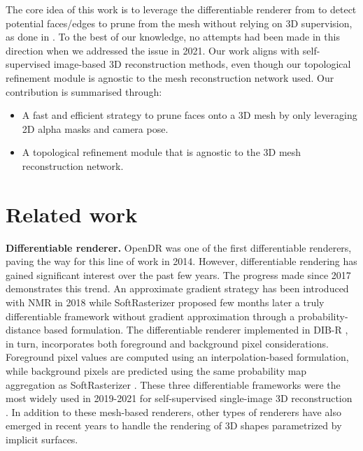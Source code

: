 The core idea of this work is to leverage the differentiable renderer from \citep{ravi2020accelarating} to detect potential faces/edges to prune from the mesh without relying on 3D supervision, as done in \citep{pan2019deep,nie2020total3dunderstanding,smith2019geometrics}. To the best of our knowledge, no attempts had been made in this direction when we addressed the issue in 2021. Our work aligns with self-supervised image-based 3D reconstruction methods, even though our topological refinement module is agnostic to the mesh reconstruction network used. Our contribution is summarised through: 
\begin{itemize}
    
    \item A fast and efficient strategy to prune faces onto a 3D mesh by only leveraging 2D alpha masks and camera pose. 

    \item A topological refinement module that is agnostic to the 3D mesh reconstruction network.
\end{itemize}

\section{Related work}
\label{sec:related_works}

\noindent\textbf{Differentiable renderer.} OpenDR \citep{loper2014opendr} was one of the first differentiable renderers, paving the way for this line of work in 2014. However, differentiable rendering has gained significant interest over the past few years. The progress made since 2017 demonstrates this trend. An approximate gradient strategy has been introduced with NMR \citep{kato2018neural} in 2018 while SoftRasterizer \citep{liu2019soft} proposed  few months later a truly differentiable framework without gradient approximation through a probability-distance based formulation. The differentiable renderer implemented in DIB-R \citep{chen2019learning}, in turn, incorporates both foreground and background pixel considerations. Foreground pixel values are computed using an interpolation-based formulation, while background pixels are predicted using the same probability map aggregation as SoftRasterizer \citep{liu2019soft}. These three differentiable frameworks were the most widely used in 2019-2021 for self-supervised single-image 3D reconstruction \citep{kanazawa2018learning,li2020self,pavllo2020convolutional}. In addition to these mesh-based renderers, other types of renderers \citep{niemeyer2020differentiable,jiang2020sdfdiff} have also emerged in recent years to handle the rendering of 3D shapes parametrized by implicit surfaces. 

